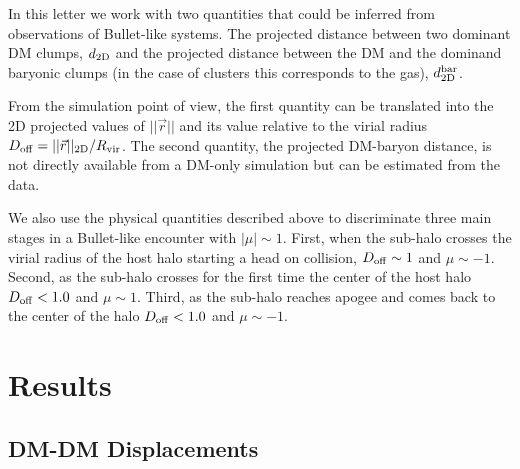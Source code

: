 \documentclass{emulateapj}
\begin{document}
In this letter we work with two quantities that could be inferred
from observations of Bullet-like systems. The projected distance
between two dominant DM clumps, $d_{\rm 2D}$ and the projected distance
between the DM and the dominand baryonic clumps (in the case of
clusters this corresponds to the gas), $d_{\rm 2D}^{\rm bar}$.

From the simulation point of view, the first quantity can be
translated into the 2D projected values of $||\vec{r}||$ and its value
relative to the virial radius $D_{\rm   off}= ||\vec{r}||_{\rm
  2D}/R_{\rm vir}$. The second quantity, the projected DM-baryon
distance, is not directly available from a DM-only simulation but can
be estimated from the data.  

We also use the physical quantities described above to discriminate
three main stages in a Bullet-like encounter with $|\mu|\sim
1$. First, when the sub-halo crosses the virial radius of the host
halo starting a head on collision, $D_{\rm   off} \sim 1$ and $\mu\sim
-1$. Second, as the sub-halo crosses for the first time the center of
the host halo $D_{\rm off}<1.0$ and $\mu\sim 1$. Third, as the
sub-halo reaches apogee and comes back to the center of the halo
$D_{\rm off} < 1.0$ and $\mu\sim -1$.   


\section{Results}
\label{sec:results}

\subsection{DM-DM Displacements}
\label{fig:displacement}
\end{document}
